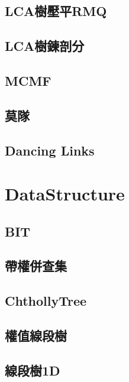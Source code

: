     \subsection{LCA樹壓平RMQ}
        
    \subsection{LCA樹鍊剖分}
        
    \subsection{MCMF}
        
    \subsection{莫隊}
        
    \subsection{Dancing Links}
        
\columnbreak

\section{DataStructure}
    \subsection{BIT}
        
    \subsection{帶權併查集}
        
        
    \columnbreak
    \subsection{ChthollyTree}
        
    \subsection{權值線段樹}
        
    \subsection{線段樹1D}
        
